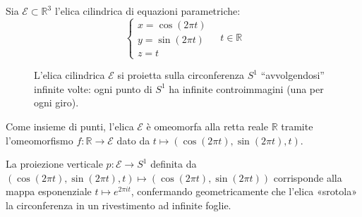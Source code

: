 \begin{ejemplo}
Sia $\mathcal{E} \subset \mathbb{R}^3$ l'elica cilindrica di equazioni parametriche:
\[
\begin{cases}
    x = \cos(2\pi t) \\
    y = \sin(2\pi t) \\
    z = t
\end{cases}
\quad t \in \mathbb{R}
\]

\begin{figure}[H]
    \centering
    \caption{L'elica cilindrica $\mathcal{E}$ si proietta sulla circonferenza $S^1$ ``avvolgendosi'' infinite volte: ogni punto di $S^1$ ha infinite controimmagini (una per ogni giro).}
\end{figure}

Come insieme di punti, l'elica $\mathcal{E}$ è omeomorfa alla retta reale $\mathbb{R}$ tramite l'omeomorfismo $f: \mathbb{R} \to \mathcal{E}$ dato da $t \mapsto (\cos(2\pi t), \sin(2\pi t), t)$.

La proiezione verticale $p: \mathcal{E} \to S^1$ definita da $(\cos(2\pi t), \sin(2\pi t), t) \mapsto (\cos(2\pi t), \sin(2\pi t))$ corrisponde alla mappa esponenziale $t \mapsto e^{2\pi i t}$, confermando geometricamente che l'elica «srotola» la circonferenza in un rivestimento ad infinite foglie.
\end{ejemplo}

\vspace{2em}

